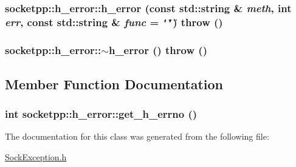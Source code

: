 \hypertarget{classsocketpp_1_1h__error_67e7b6bcd23ebdd79a5fdcf1f01070fe}{
\subsubsection[{h\_\-error}]{\setlength{\rightskip}{0pt plus 5cm}socketpp::h\_\-error::h\_\-error (const std::string \& {\em meth}, \/  int {\em err}, \/  const std::string \& {\em func} = {\tt \char`\"{}\char`\"{}})  throw ()}}
\label{classsocketpp_1_1h__error_67e7b6bcd23ebdd79a5fdcf1f01070fe}


\hypertarget{classsocketpp_1_1h__error_56261f751b9080d0a67f282e7ab2974b}{
\subsubsection[{$\sim$h\_\-error}]{\setlength{\rightskip}{0pt plus 5cm}socketpp::h\_\-error::$\sim$h\_\-error ()  throw ()}}
\label{classsocketpp_1_1h__error_56261f751b9080d0a67f282e7ab2974b}




\subsection{Member Function Documentation}
\hypertarget{classsocketpp_1_1h__error_b2aabd50ea2f3189b09bc749a875e38f}{
\subsubsection[{get\_\-h\_\-errno}]{\setlength{\rightskip}{0pt plus 5cm}int socketpp::h\_\-error::get\_\-h\_\-errno ()}}
\label{classsocketpp_1_1h__error_b2aabd50ea2f3189b09bc749a875e38f}




The documentation for this class was generated from the following file:\begin{CompactItemize}
\item 
\hyperlink{SockException_8h}{SockException.h}\end{CompactItemize}
